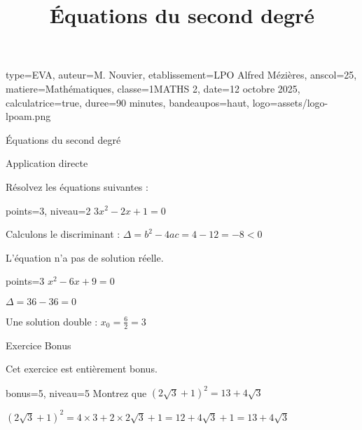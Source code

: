 \documentclass[correctionfin,theme=vert]{nfdevoirs}
\title{Équations du second degré}
\begin{document}
\begin{devoir}{
        type=EVA,
        auteur={M. Nouvier},
        etablissement={LPO Alfred Mézières},
        anscol=25,
        matiere={Mathématiques},
        classe={1MATHS 2},
        date={12 octobre 2025},
        calculatrice=true,
        duree={90 minutes},
        bandeaupos=haut,
        logo={assets/logo-lpoam.png}
    }

    \begin{partie}{Équations du second degré}

        \begin{exercice}{Application directe}

            Résolvez les équations suivantes :

            \begin{question}{points=3, niveau=2}
                $3x^2 - 2x + 1 = 0$
            \end{question}

            \begin{correction}
                Calculons le discriminant : $\Delta = b^2 - 4ac = 4 - 12 = -8 < 0$

                L'équation n'a pas de solution réelle.
            \end{correction}

            \begin{question}{points=3}
                $x^2 - 6x + 9 = 0$
            \end{question}

            \begin{correction}
                $\Delta = 36 - 36 = 0$

                Une solution double : $x_0 = \frac{6}{2} = 3$
            \end{correction}

        \end{exercice}

        \begin{exercice}{Exercice Bonus}

            Cet exercice est entièrement bonus.

            \begin{question}{bonus=5, niveau=5}
                Montrez que $(2\sqrt{3} + 1)^2 = 13 + 4\sqrt{3}$
            \end{question}

            \begin{correction}
                $(2\sqrt{3} + 1)^2 = 4 \times 3 + 2 \times 2\sqrt{3} + 1 = 12 + 4\sqrt{3} + 1 = 13 + 4\sqrt{3}$
            \end{correction}

        \end{exercice}

    \end{partie}

\end{devoir}
\end{document}
